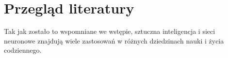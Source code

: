 \chapter{Przegląd literatury}

\hspace{0.5cm}
Tak jak zostało to wspomniane we wstępie, sztuczna inteligencja i sieci neuronowe znajdują wiele zastosowań w różnych dziedzinach nauki i życia codziennego. 